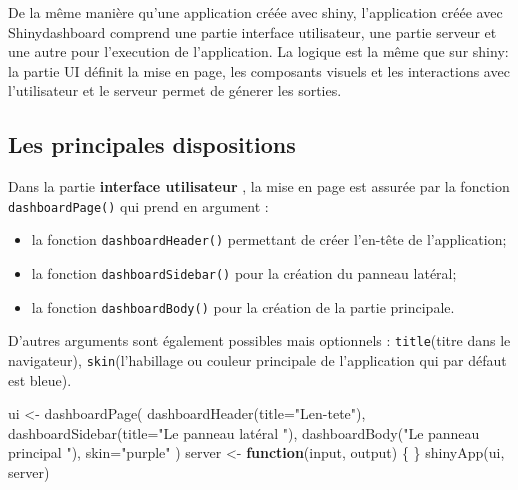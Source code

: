 \documentclass[
]{article}
\newenvironment{Shaded}{\begin{snugshade}}{\end{snugshade}}
\newcommand{\AttributeTok}[1]{\textcolor[rgb]{0.77,0.63,0.00}{#1}}
\newcommand{\ControlFlowTok}[1]{\textcolor[rgb]{0.13,0.29,0.53}{\textbf{#1}}}
\newcommand{\FunctionTok}[1]{\textcolor[rgb]{0.00,0.00,0.00}{#1}}
\newcommand{\NormalTok}[1]{#1}
\newcommand{\OtherTok}[1]{\textcolor[rgb]{0.56,0.35,0.01}{#1}}
\newcommand{\StringTok}[1]{\textcolor[rgb]{0.31,0.60,0.02}{#1}}
\begin{document}
De la même manière qu'une application créée avec shiny, l'application
créée avec Shinydashboard comprend une partie interface utilisateur, une
partie serveur et une autre pour l'execution de l'application. La
logique est la même que sur shiny: la partie UI définit la mise en page,
les composants visuels et les interactions avec l'utilisateur et le
serveur permet de génerer les sorties.

\hypertarget{les-principales-dispositions}{%
\subsection{Les principales
dispositions}\label{les-principales-dispositions}}

Dans la partie \textbf{interface utilisateur} , la mise en page est
assurée par la fonction \texttt{dashboardPage()} qui prend en argument :

\begin{itemize}
\item
  la fonction \texttt{dashboardHeader()} permettant de créer l'en-tête
  de l'application;
\item
  la fonction \texttt{dashboardSidebar()} pour la création du panneau
  latéral;
\item
  la fonction \texttt{dashboardBody()} pour la création de la partie
  principale.
\end{itemize}

D'autres arguments sont également possibles mais optionnels :
\texttt{title}(titre dans le navigateur), \texttt{skin}(l'habillage ou
couleur principale de l'application qui par défaut est bleue).

\begin{Shaded}
\begin{Highlighting}[]
\NormalTok{ui }\OtherTok{\textless{}{-}} \FunctionTok{dashboardPage}\NormalTok{(}
  \FunctionTok{dashboardHeader}\NormalTok{(}\AttributeTok{title=}\StringTok{"L\textquotesingle{}en{-}tete"}\NormalTok{),}
  \FunctionTok{dashboardSidebar}\NormalTok{(}\AttributeTok{title=}\StringTok{"Le panneau latéral "}\NormalTok{),}
  \FunctionTok{dashboardBody}\NormalTok{(}\StringTok{"Le panneau principal "}\NormalTok{),}
  \AttributeTok{skin=}\StringTok{"purple"}
\NormalTok{)}
\NormalTok{server }\OtherTok{\textless{}{-}} \ControlFlowTok{function}\NormalTok{(input, output) \{}
\NormalTok{\}}
\FunctionTok{shinyApp}\NormalTok{(ui, server)}
\end{Highlighting}
\end{Shaded}
\end{document}
